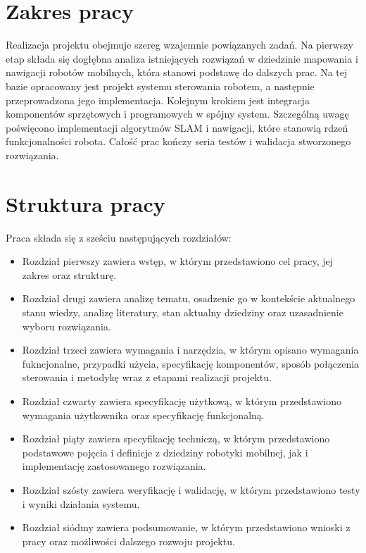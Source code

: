 \documentclass[a4paper,twoside,12pt]{book}
\begin{document}
\section{Zakres pracy}
Realizacja projektu obejmuje szereg wzajemnie powiązanych zadań. Na pierwszy etap składa się dogłębna analiza istniejących rozwiązań w dziedzinie mapowania i nawigacji robotów mobilnych, która stanowi podstawę do dalszych prac. Na tej bazie opracowany jest projekt systemu sterowania robotem, a następnie przeprowadzona jego implementacja. Kolejnym krokiem jest integracja komponentów sprzętowych i programowych w spójny system. Szczególną uwagę poświęcono implementacji algorytmów SLAM i nawigacji, które stanowią rdzeń funkcjonalności robota. Całość prac kończy seria testów i walidacja stworzonego rozwiązania.



\section{Struktura pracy}
Praca składa się z sześciu następujących rozdziałów:
\begin{itemize}
\item Rozdział pierwszy zawiera wstęp, w którym przedstawiono cel pracy, jej zakres oraz strukturę.
\item Rozdział drugi zawiera analizę tematu, osadzenie go w kontekście aktualnego stanu wiedzy, analizę literatury, stan aktualny dziedziny oraz uzasadnienie wyboru rozwiązania.
\item Rozdział trzeci zawiera wymagania i narzędzia, w którym opisano wymagania fukncjonalne, przypadki użycia, specyfikację komponentów, sposób połączenia sterowania i metodykę wraz z etapami realizacji projektu.
\item Rozdział czwarty zawiera specyfikację użytkową, w którym przedstawiono wymagania użytkownika oraz specyfikację funkcjonalną.
\item Rozdział piąty zawiera specyfikację techniczą, w którym przedstawiono podstawowe pojęcia i definicje z dziedziny robotyki mobilnej, jak i implementację zastosowanego rozwiązania.
\item Rozdział szósty zawiera weryfikację i walidację, w którym przedstawiono testy i wyniki działania systemu.
\item Rozdział siódmy zawiera podsumowanie, w którym przedstawiono wnioski z pracy oraz możliwości dalszego rozwoju projektu.
\end{itemize}
\end{document}
